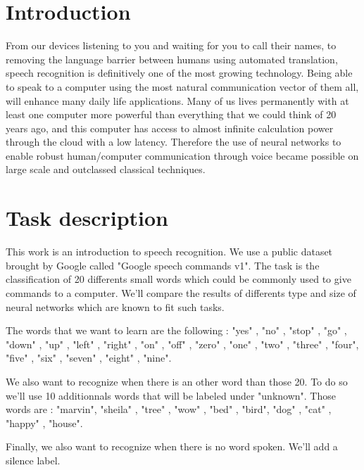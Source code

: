 \section{Introduction}
From our devices listening to you and waiting for you to call their names, to removing the language barrier between humans using automated translation, speech recognition is definitively one of the most growing technology. Being able to speak to a computer using the most natural communication vector of them all, will enhance many daily life applications. Many of us lives permanently with at least one computer more powerful than everything that we could think of 20 years ago, and this computer has access to almost infinite calculation power through the cloud with a low latency. Therefore the use of neural networks to enable robust human/computer communication through voice became possible on large scale and outclassed classical techniques.

\section{Task description}

This work is an introduction to speech recognition. We use a public dataset brought by Google called "Google speech commands v1". The task is the classification of 20 differents small words which could be commonly used to give commands to a computer. We'll compare the results of differents type and size of neural networks which are known to fit such tasks.

\vspace{5mm}

The words that we want to learn are the following : "yes" ,  "no" , "stop" , "go" , "down" , "up" , "left" , "right" , "on" , "off" , "zero" , "one" , "two" , "three" , "four", "five" , "six" , "seven" , "eight" , "nine".

\vspace{5mm}

We also want to recognize when there is an other word than those 20. To do so we'll use 10 additionnals words that will be labeled under "unknown". Those words are  :  "marvin", "sheila" , "tree" , "wow" , "bed" , "bird", "dog" , "cat" , "happy" , "house". 

\vspace{5mm}

Finally, we also want to recognize when there is no word spoken. We'll add a silence label.

